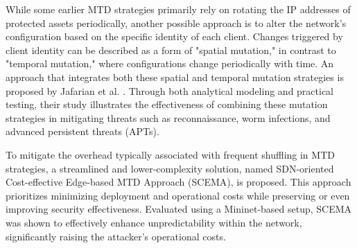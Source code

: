While some earlier MTD strategies primarily rely on rotating the IP addresses of protected assets periodically, another possible approach is to alter the network's configuration based on the specific identity of each client. Changes triggered by client identity can be described as a form of "spatial mutation," in contrast to "temporal mutation," where configurations change periodically with time. An approach that integrates both these spatial and temporal mutation strategies is proposed by Jafarian et al. \cite{jafarian2014}. Through both analytical modeling and practical testing, their study illustrates the effectiveness of combining these mutation strategies in mitigating threats such as reconnaissance, worm infections, and advanced persistent threats (APTs).

To mitigate the overhead typically associated with frequent shuffling in MTD strategies, a streamlined and lower-complexity solution, named SDN-oriented Cost-effective Edge-based MTD Approach (SCEMA)\cite{javadpour2022}, is proposed. This approach prioritizes minimizing deployment and operational costs while preserving or even improving security effectiveness. Evaluated using a Mininet-based setup, SCEMA was shown to effectively enhance unpredictability within the network, significantly raising the attacker's operational costs.